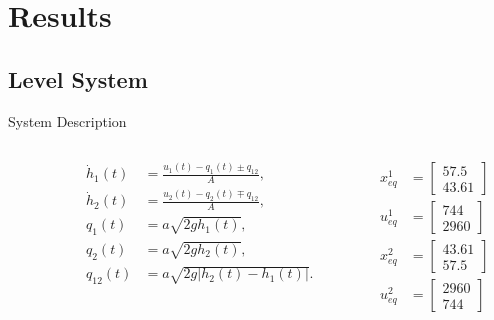 
\section{Results}%
\label{sec:results}

\subsection{Level System}%
\label{subsec:level-system}

\begin{slide}{System Description}
  \begin{columns}[c]
    \begin{column}{0.45\textwidth}
      
    \end{column}
    \hfill%
    \begin{column}{0.35\textwidth}
      \begin{equation}
        \label{eq:formula-height-variation-lin}
        \begin{aligned}
          \dot{h}_1(t) & = \frac{u_1(t)-q_1(t)\pm{}q_{12}}{A},   \\
          \dot{h}_2(t) & = \frac{u_2(t)-q_2(t)\mp{}q_{12}}{A},   \\
          q_1(t)       & = a\sqrt{2gh_1(t)},                     \\
          q_2(t)       & = a\sqrt{2gh_2(t)},                     \\
          q_{12}(t)    & = a\sqrt{2g\left|h_2(t)-h_1(t)\right|}.
        \end{aligned}
      \end{equation}
    \end{column}%
    \hfill%
    \begin{column}{0.2\textwidth}
      \begin{equation}
        \begin{aligned}
          x_{eq}^1 & = \begin{bmatrix}
            57.5 \\ 43.61
          \end{bmatrix} \\
          u_{eq}^1 & = \begin{bmatrix}
            744 \\ 2960
          \end{bmatrix} \\
          x_{eq}^2 & = \begin{bmatrix}
            43.61 \\ 57.5
          \end{bmatrix} \\
          u_{eq}^2 & = \begin{bmatrix}
            2960 \\ 744
          \end{bmatrix}
        \end{aligned}
      \end{equation}
    \end{column}%
  \end{columns}
\end{slide}


